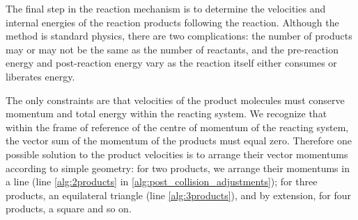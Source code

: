 The final step in the reaction mechanism is to determine the velocities
and internal energies of the reaction products following the reaction.
Although the method is standard physics, there are two complications:
the number of products may or may not be the same as the number of
reactants, and the pre-reaction energy and post-reaction energy vary as
the reaction itself either consumes or liberates energy.

The only constraints are that velocities of the product molecules must
conserve momentum and total energy within the reacting system. We
recognize that within the frame of reference of the centre of momentum
of the reacting system, the vector sum of the momentum of the products
must equal zero. Therefore one possible solution to the product
velocities is to arrange their vector momentums according to simple
geometry: for two products, we arrange their momentums in a line (line
\cref{alg:2products} in \cref{alg:post_collision_adjustments}); for three
products, an equilateral triangle (line \cref{alg:3products}), and by
extension, for four products, a square and so on.

